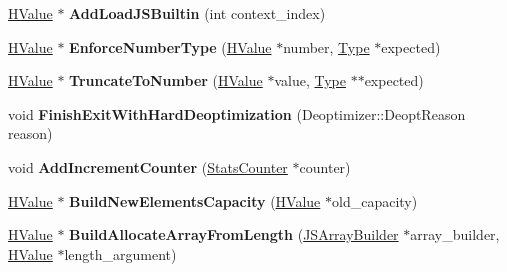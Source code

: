\begin{DoxyCompactItemize}
\item 
\hyperlink{classv8_1_1internal_1_1_h_value}{H\+Value} $\ast$ {\bfseries Add\+Load\+J\+S\+Builtin} (int context\+\_\+index)\hypertarget{classv8_1_1internal_1_1_h_graph_builder_a43ad6317e44981642bcf111bb852ec79}{}\label{classv8_1_1internal_1_1_h_graph_builder_a43ad6317e44981642bcf111bb852ec79}

\item 
\hyperlink{classv8_1_1internal_1_1_h_value}{H\+Value} $\ast$ {\bfseries Enforce\+Number\+Type} (\hyperlink{classv8_1_1internal_1_1_h_value}{H\+Value} $\ast$number, \hyperlink{classv8_1_1internal_1_1_type}{Type} $\ast$expected)\hypertarget{classv8_1_1internal_1_1_h_graph_builder_aa0318ed052ad3dde76828cc864ece24f}{}\label{classv8_1_1internal_1_1_h_graph_builder_aa0318ed052ad3dde76828cc864ece24f}

\item 
\hyperlink{classv8_1_1internal_1_1_h_value}{H\+Value} $\ast$ {\bfseries Truncate\+To\+Number} (\hyperlink{classv8_1_1internal_1_1_h_value}{H\+Value} $\ast$value, \hyperlink{classv8_1_1internal_1_1_type}{Type} $\ast$$\ast$expected)\hypertarget{classv8_1_1internal_1_1_h_graph_builder_ad85f954e0270d90f5d078d607b5069ba}{}\label{classv8_1_1internal_1_1_h_graph_builder_ad85f954e0270d90f5d078d607b5069ba}

\item 
void {\bfseries Finish\+Exit\+With\+Hard\+Deoptimization} (Deoptimizer\+::\+Deopt\+Reason reason)\hypertarget{classv8_1_1internal_1_1_h_graph_builder_a88695429a1701a5bf1d6955e6e4cac76}{}\label{classv8_1_1internal_1_1_h_graph_builder_a88695429a1701a5bf1d6955e6e4cac76}

\item 
void {\bfseries Add\+Increment\+Counter} (\hyperlink{classv8_1_1internal_1_1_stats_counter}{Stats\+Counter} $\ast$counter)\hypertarget{classv8_1_1internal_1_1_h_graph_builder_acffb06904a8374625c042229fa46d4a4}{}\label{classv8_1_1internal_1_1_h_graph_builder_acffb06904a8374625c042229fa46d4a4}

\item 
\hyperlink{classv8_1_1internal_1_1_h_value}{H\+Value} $\ast$ {\bfseries Build\+New\+Elements\+Capacity} (\hyperlink{classv8_1_1internal_1_1_h_value}{H\+Value} $\ast$old\+\_\+capacity)\hypertarget{classv8_1_1internal_1_1_h_graph_builder_aae8a99189e14174540b8e6720b39fb76}{}\label{classv8_1_1internal_1_1_h_graph_builder_aae8a99189e14174540b8e6720b39fb76}

\item 
\hyperlink{classv8_1_1internal_1_1_h_value}{H\+Value} $\ast$ {\bfseries Build\+Allocate\+Array\+From\+Length} (\hyperlink{classv8_1_1internal_1_1_h_graph_builder_1_1_j_s_array_builder}{J\+S\+Array\+Builder} $\ast$array\+\_\+builder, \hyperlink{classv8_1_1internal_1_1_h_value}{H\+Value} $\ast$length\+\_\+argument)\hypertarget{classv8_1_1internal_1_1_h_graph_builder_a13b29de0ba2ac4d2683acec621ae783d}{}\label{classv8_1_1internal_1_1_h_graph_builder_a13b29de0ba2ac4d2683acec621ae783d}


\end{DoxyCompactItemize}

